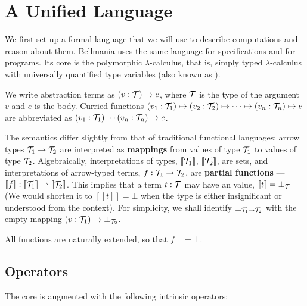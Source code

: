 \section{A Unified Language}

\newcommand\semp[1]{[\![{#1}]\!]}
\newcommand\fix{\operatorname{fix}}

We first set up a formal language that we will use to describe computations and reason about them.
Bellmania uses the same language for specifications and for programs.  Its core is the polymorphic
$\lambda$-calculus, that is, simply typed $\lambda$-calculus with universally quantified type variables 
(also known as ).

We write abstraction terms as $(v:\mathcal{T})\mapsto e$, where $\mathcal{T}$ is the type of the argument $v$ and $e$ is
the body. Curried functions $(v_1:\mathcal{T}_1)\mapsto (v_2:\mathcal{T}_2) \mapsto \cdots \mapsto (v_n:\mathcal{T}_n) \mapsto e$ are abbreviated 
as $(v_1:\mathcal{T}_1)\cdots(v_n:\mathcal{T}_n)\mapsto e$.

The semantics differ slightly from that of traditional functional languages: arrow types $\mathcal{T}_1\to\mathcal{T}_2$
are interpreted as {\bf mappings} from values of type $\mathcal{T}_1$ to values of type $\mathcal{T}_2$. Algebraically,
interpretations of types, $\semp{\T_1}$, $\semp{\T_2}$, are sets, and interpretations of arrow-typed terms,
$f : \mathcal{T}_1\to\mathcal{T}_2$, are {\bf partial functions} --- $\semp{f} : \semp{\T_1}\rightharpoonup\semp{\T_2}$.
This implies that a term $t : \mathcal{T}$ may have an  value, $\semp{t}=\bot_\T$
(We would shorten it to $\semp{t}=\bot$ when the type is either insignificant or understood from the context).
For simplicity, we shall identify $\bot_{\mathcal{T}_1\to\mathcal{T}_2}$ with the empty mapping $(v:\mathcal{T}_1)\mapsto\bot_{\mathcal{T}_2}$.

All functions are naturally extended, so that $f\,\bot=\bot$.

\subsection{Operators}
\label{lang:operators}

The core is augmented with the following intrinsic operators:

